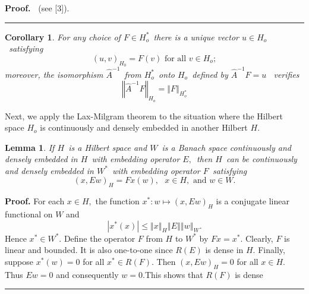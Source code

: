 \documentclass{article}
\newtheorem{corollary}[theorem]{Corollary}
\newtheorem{lemma}[theorem]{Lemma}
\newenvironment{proof}[1][Proof]{\noindent\textbf{#1.} }{\ \rule{0.5em}{0.5em}}
\begin{document}
\begin{proof}
\textbf{\ }(see [3]).
\end{proof}

\begin{corollary}
\textit{For any choice of }$F\in H_{o}^{\ast }$\textit{\ there is a unique
vector }$u\in H_{o}$\textit{\ satisfying }%
\begin{equation*}
\left( u,v\right) _{H_{0}}=F(v)\text{ \ \ \ \ \ \ \ for all }v\in H_{o};
\end{equation*}%
\textit{moreover, the isomorphism }$\hat{A}^{-1}$\textit{\ from }$%
H_{o}^{\ast }$\textit{\ onto }$H_{o}$\textit{\ defined by }$\hat{A}^{-1}F=u$%
\textit{\ verifies }%
\begin{equation*}
\left\Vert \hat{A}^{-1}F\right\Vert _{H_{o}}=\left\Vert F\right\Vert
_{H_{o}^{\ast }}
\end{equation*}
\end{corollary}

Next, we apply the Lax-Milgram theorem to the situation where the Hilbert
space $H_{o}$ is continuously and densely embedded in another Hilbert $H.$

\begin{lemma}
\textit{If }$H$\textit{\ is a Hilbert space and }$W$\textit{\ is a Banach
space continuously and densely embedded in }$H$\textit{\ with embedding
operator }$E,$\textit{\ then }$H$\textit{\ can be continuously and densely
embedded in }$W^{\ast }$\textit{\ with embedding operator }$F$\textit{\
satisfying }%
\begin{equation*}
\left( x,Ew\right) _{H}=Fx(w),\text{ \ \ \ \ }x\in H,\text{ \ \ and \ \ }%
w\in W.
\end{equation*}
\end{lemma}

\begin{proof}
For each $x\in H,$ the function $x^{\ast }:w\longmapsto \left( x,Ew\right)
_{H}$ is a conjugate linear functional on $W$ and 
\begin{equation*}
\left\vert x^{\ast }(x)\right\vert \leq \left\Vert x\right\Vert
_{H}\left\Vert E\right\Vert \left\Vert w\right\Vert _{W}.
\end{equation*}%
Hence $x^{\ast }\in W^{\ast }.$ Define the operator $F$ from $H$ to $W^{\ast
}$ by $Fx=x^{\ast }.$ Clearly, $F$ is linear and bounded. It is also
one-to-one since $R(E)$ is dense in $H.$ Finally, suppose $x^{\ast }(w)=0$
for all $x^{\ast }\in R(F).$ Then $\left( x,Ew\right) _{H}=0$ for all $x\in
H.$ Thus $Ew=0$ and consequently $w=0.$This shows that $R(F)$ is dense
\end{proof}
\end{document}
